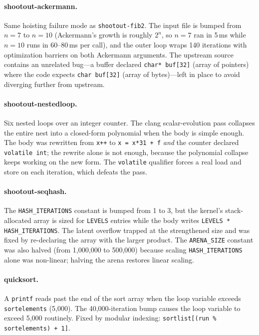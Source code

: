 \paragraph{shootout-ackermann.} Same hoisting failure mode as \texttt{shootout-fib2}. The input file is bumped from $n = 7$ to $n = 10$ (Ackermann's growth is roughly $2^n$, so $n = 7$ ran in 5\,ms while $n = 10$ runs in 60--80\,ms per call), and the outer loop wraps 140 iterations with optimization barriers on both Ackermann arguments. The upstream source contains an unrelated bug---a buffer declared \texttt{char* buf[32]} (array of pointers) where the code expects \texttt{char buf[32]} (array of bytes)---left in place to avoid diverging further from upstream.

\paragraph{shootout-nestedloop.} Six nested loops over an integer counter. The clang scalar-evolution pass collapses the entire nest into a closed-form polynomial when the body is simple enough. The body was rewritten from \texttt{x++} to \texttt{x = x*31 + f} \emph{and} the counter declared \texttt{volatile int}; the rewrite alone is not enough, because the polynomial collapse keeps working on the new form. The \texttt{volatile} qualifier forces a real load and store on each iteration, which defeats the pass.

\paragraph{shootout-seqhash.} The \texttt{HASH\_ITERATIONS} constant is bumped from 1 to 3, but the kernel's stack-allocated array is sized for \texttt{LEVELS} entries while the body writes \texttt{LEVELS * HASH\_ITERATIONS}. The latent overflow trapped at the strengthened size and was fixed by re-declaring the array with the larger product. The \texttt{ARENA\_SIZE} constant was also halved (from 1{,}000{,}000 to 500{,}000) because scaling \texttt{HASH\_ITERATIONS} alone was non-linear; halving the arena restores linear scaling.

\paragraph{quicksort.} A \texttt{printf} reads past the end of the sort array when the loop variable exceeds \texttt{sortelements} (5{,}000). The 40{,}000-iteration bump causes the loop variable to exceed 5{,}000 routinely. Fixed by modular indexing: \texttt{sortlist[(run \% sortelements) + 1]}.

